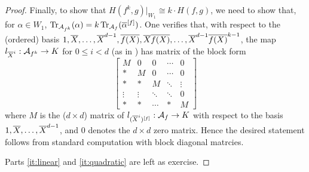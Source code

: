 \documentclass[12pt, leqno, british]{amsart}
\begin{document}
\begin{proof}
Finally, to show that $H(f^k, g)\vert_{W_1} \cong k \cdot H(f, g)$, we need to show that, for $\alpha \in W_1$, $\operatorname{Tr}_{\mathcal{A}_{f^k}}(\alpha) = k\operatorname{Tr}_{\mathcal{A}_{f}}(\overline{\alpha}^{[f]})$.
One verifies that, with respect to the (ordered) basis $1, \overline{X}, \ldots, \overline{X}^{d-1}, \overline{f(X)}, \overline{X}\overline{f(X)}, \ldots, \overline{X}^{d-1}\overline{f(X)}^{k-1}$, the map $l_{\overline{X}^i} : \mathcal{A}_{f^k} \to K$ for $0 \leq i < d$ (as in ) has matrix of the block form
\begin{displaymath}
\begin{bmatrix}
M & 0 & 0 & \cdots & 0 \\
\ast & M & 0 & \cdots & 0 \\
\ast & \ast & M & \ddots & \vdots \\
\vdots & \vdots & \ddots & \ddots & 0 \\
\ast & \ast & \cdots & \ast & M
\end{bmatrix}
\end{displaymath}
where $M$ is the ($d \times d$) matrix of $l_{(\overline{X}^i)^{[f]}} : \mathcal{A}_f \to K$ with respect to the basis $1, \overline{X}, \ldots, \overline{X}^{d-1}$, and $0$ denotes the $d \times d$ zero matrix.
Hence the desired statement follows from standard computation with block diagonal matrcies.

Parts \eqref{it:linear} and \eqref{it:quadratic} are left as exercise.
\end{proof}
\end{document}
